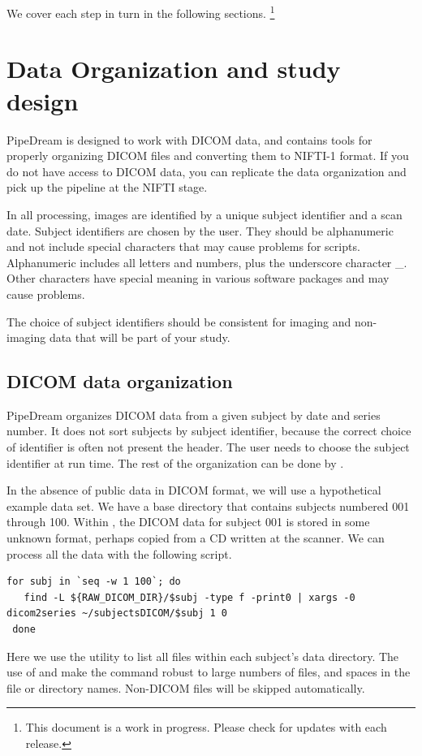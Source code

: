 \documentclass{InsightArticle}
\begin{document}
We cover each step in turn in the following sections. \footnote{This document is a work in progress. Please check for updates with each release.}


\section{Data Organization and study design}

PipeDream is designed to work with DICOM data, and contains tools for properly organizing DICOM files and converting them to NIFTI-1 format. If you do not have access to DICOM data, you can replicate the data organization and pick up the pipeline at the NIFTI stage.

In all processing, images are identified by a unique subject identifier and a scan date. Subject identifiers are chosen by the user. They should be alphanumeric and not include special characters that may cause problems for scripts. Alphanumeric includes all letters and numbers, plus the underscore character \_. Other characters have special meaning in various software packages and may cause problems. 

The choice of subject identifiers should be consistent for imaging and non-imaging data that will be part of your study. 


\subsection{DICOM data organization}

PipeDream organizes DICOM data from a given subject by date and series number. It does not sort subjects by subject identifier, because the correct choice of identifier is often not present the header. The user needs to choose the subject identifier at run time. The rest of the organization can be done by .

In the absence of public data in DICOM format, we will use a hypothetical example data set. We have a base directory  that contains subjects numbered 001 through 100. Within , the DICOM data for subject 001 is stored in some unknown format, perhaps copied from a CD written at the scanner. We can process all the data with the following script.
\begin{lstlisting}[style=bash]
 for subj in `seq -w 1 100`; do
   find -L ${RAW_DICOM_DIR}/$subj -type f -print0 | xargs -0 dicom2series ~/subjectsDICOM/$subj 1 0 
 done
\end{lstlisting}
Here we use the  utility to list all files within each subject's data directory. The use of  and  make the command robust to large numbers of files, and spaces in the file or directory names. Non-DICOM files will be skipped automatically. 
\end{document}

